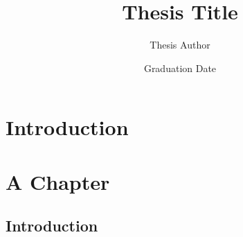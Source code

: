 \documentclass{ucetd}
\title{Thesis Title}
\author{Thesis Author}
\date{Graduation Date}
\begin{document}
\maketitle

\makecopyright
\makededication
\makeepigraph


\tableofcontents
\listoffigures
\listoftables

\acknowledgments

\abstract

\mainmatter

\chapter{Introduction}

\chapter{A Chapter}
\section{Introduction}

\makebibliography

%
%
\end{document}
